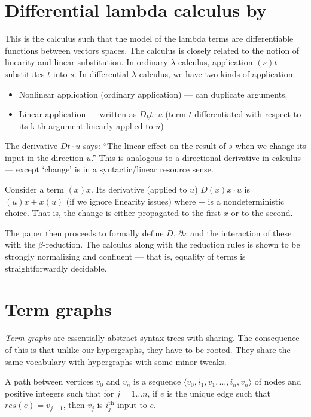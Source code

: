 \documentclass[acmsmall,screen, nonacm, anonymous]{acmart}
\begin{document}
\section{Differential lambda calculus by ~\citet{DiffLambdaCalc}}

This is the calculus such that the model of the lambda terms are differentiable functions between vectors spaces.
The calculus is closely related to the notion of linearity and linear substitution.
In ordinary $\lambda$-calculus, application $(s) t$ substitutes $t$ into $s$.
In differential $\lambda$-calculus, we have two kinds of application:
\begin{itemize}

\item Nonlinear application (ordinary application) --- can duplicate arguments.

\item Linear application --- written as $D_{k} t \cdot u$ (term $t$ differentiated with respect to its k-th argument linearly applied to $u$)

\end{itemize}
The derivative $D t \cdot u$ says: \enquote{The linear effect on the result of $s$ when we change its input in the direction $u$.}
This is analogous to a directional derivative in calculus --- except `change' is in a syntactic/linear resource sense.

\begin{example}
Consider a term $(x) x$.
Its derivative (applied to $u$) $D (x) x \cdot u$ is $(u) x + x (u)$ (if we ignore linearity issues) where $+$ is a nondeterministic choice.
That is, the change is either propagated to the first $x$ or to the second.
\end{example}

The paper then proceeds to formally define $D$, $\partial x$ and the interaction of these with the $\beta$-reduction.
The calculus along with the reduction rules is shown to be strongly normalizing and confluent --- that is, equality of terms is straightforwardly decidable.

\section{Term graphs}

\textit{Term graphs} are essentially abstract syntax trees with sharing.
The consequence of this is that unlike our hypergraphs, they have to be rooted.
They share the same vocabulary with hypergraphs with some minor tweaks.
\begin{definition}
  A path between vertices $v_0$ and $v_n$ is a sequence $\langle v_0, i_1, v_1, \ldots, i_n, v_n \rangle$ of nodes and positive integers such that for $j = 1 \ldots n$, if $e$ is the unique edge such that $res(e) = v_{j-1}$, then $v_j$ is $i^{\text{th}}_j$ input to $e$.
\end{definition}
\end{document}
